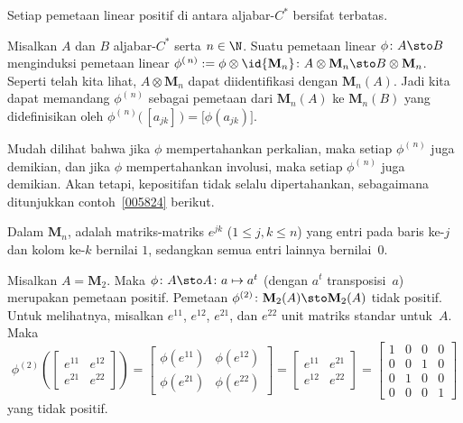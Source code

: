 \begin{prop} Setiap pemetaan linear positif di antara aljabar-$C^*$ bersifat terbatas.
\end{prop}

\begin{notn} Misalkan $A$ dan $B$ aljabar-$C^*$ serta $n \in \N$. Suatu pemetaan linear $\phi\colon A \sto
B$ menginduksi pemetaan linear $\phi^{(\,n)} := \phi \otimes \id{\mathbf M_n}\colon A \otimes
\mathbf M_n \sto B \otimes \mathbf M_n$. Seperti telah kita lihat, $A \otimes \mathbf M_n$ dapat
diidentifikasi dengan $\mathbf M_n(A)$. Jadi kita dapat memandang $\phi^{(\,n)}$ sebagai pemetaan dari
$\mathbf M_n(A)$ ke $\mathbf M_n(B)$ yang didefinisikan oleh $\phi^{(\,n)}\big(\,[a_{jk}]\,\bigr) =
\bigl[ \phi(a_{jk})\bigr]$.
\end{notn}

Mudah dilihat bahwa jika $\phi$ mempertahankan perkalian, maka setiap $\phi^{(\,n)}$ juga demikian,
dan jika $\phi$ mempertahankan involusi, maka setiap $\phi^{(\,n)}$ juga demikian.
Akan tetapi, kepositifan tidak selalu dipertahankan, sebagaimana ditunjukkan contoh~\ref{005824} berikut.

\begin{defn} Dalam $\mathbf M_n$,
 adalah matriks-matriks $e^{jk}$ ($1 \le j,k \le n$) yang entri pada
baris ke-$j$ dan kolom ke-$k$ bernilai $1$, sedangkan semua entri lainnya
bernilai~$0$.
\end{defn}

\begin{exam}\label{005824} Misalkan $A = \mathbf M_2$. Maka $\phi\colon A \sto A\colon a \mapsto a^t$
(dengan $a^t$ transposisi~$a$) merupakan pemetaan positif. Pemetaan $\phi^{(2)}\colon
\mathbf M_2(A) \sto \mathbf M_2(A)$ tidak positif. Untuk melihatnya, misalkan $e^{11}$, $e^{12}$,
$e^{21}$, dan $e^{22}$ unit matriks standar untuk~$A$. Maka
  \[ \phi^{(2)}\left(\begin{bmatrix} e^{11} & e^{12} \\ e^{21} & e^{22} \end{bmatrix}\right)
    = \begin{bmatrix} \phi(e^{11}) & \phi(e^{12}) \\ \phi(e^{21}) & \phi(e^{22}) \end{bmatrix}
    = \begin{bmatrix} e^{11} & e^{21} \\ e^{12} & e^{22} \end{bmatrix}
    = \begin{bmatrix} 1 & 0 & 0 & 0 \\
                      0 & 0 & 1 & 0 \\
                      0 & 1 & 0 & 0 \\
                      0 & 0 & 0 & 1
      \end{bmatrix} \]
yang tidak positif.
\end{exam}

